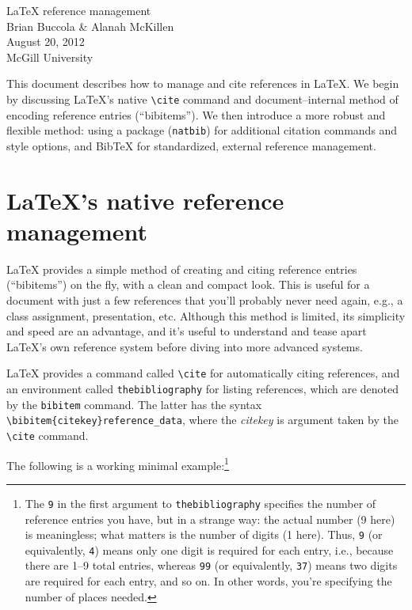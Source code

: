 \documentclass[letterpaper,12pt]{article}
\newcounter{ex-count}
\begin{document}
\begin{center}
    {\LARGE \LaTeX{} reference management}
    \\[\baselineskip]
    Brian Buccola \& Alanah McKillen \\
    August 20, 2012 \\ McGill University
\end{center}

\vspace{\baselineskip}

This document describes how to manage and cite references in \LaTeX{}. We begin
by discussing \LaTeX{}'s native \verb-\cite- command and document--internal
method of encoding reference entries (``bibitems''). We then introduce a more
robust and flexible method: using a package (\verb-natbib-) for additional
citation commands and style options, and Bib\TeX{} for standardized, external
reference management.


\section{\LaTeX{}'s native reference management}

\LaTeX{} provides a simple method of creating and citing reference entries
(``bibitems'') on the fly, with a clean and compact look. This is useful for a
document with just a few references that you'll probably never need again, e.g.,
a class assignment, presentation, etc. Although this method is limited, its
simplicity and speed are an advantage, and it's useful to understand and tease
apart \LaTeX{}'s own reference system before diving into more advanced systems.

\LaTeX{} provides a command called \verb-\cite- for automatically citing
references, and an environment called \verb-thebibliography- for listing
references, which are denoted by the \verb-bibitem- command. The latter has the
syntax \verb-\bibitem{citekey}reference_data-, where the \emph{citekey} is
argument taken by the \verb-\cite- command.

The following is a working minimal example:\footnote{%
    The \texttt{9} in the first argument to \texttt{thebibliography} specifies
    the number of reference entries you have, but in a strange way: the actual
    number (9 here) is meaningless; what matters is the number of digits (1
    here). Thus, \texttt{9} (or equivalently, \texttt{4}) means only one digit
    is required for each entry, i.e., because there are 1--9 total entries,
    whereas \texttt{99} (or equivalently, \texttt{37}) means two digits are
    required for each entry, and so on. In other words, you're specifying the
    number of places needed.
}
\end{document}
